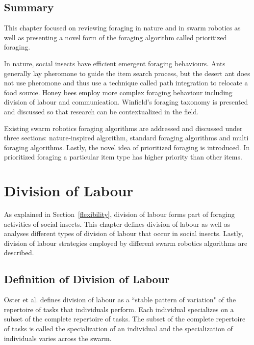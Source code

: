 \section{Summary}
\label{foraging:summary}

This chapter focused on reviewing foraging in nature and in swarm robotics as well as presenting a novel form of the foraging algorithm called prioritized foraging. 

In nature, social insects have efficient emergent foraging behaviours. Ants generally lay pheromone to guide the item search process, but the desert ant does not use pheromone and thus use a technique called path integration to relocate a food source. Honey bees employ more complex foraging behaviour including division of labour and communication. Winfield's foraging taxonomy is presented and discussed so that research can be contextualized in the field. 

Existing swarm robotics foraging algorithms are addressed and discussed under three sections: nature-inspired algorithm, standard foraging algorithms and multi foraging algorithms. Lastly, the novel idea of prioritized foraging is introduced. In prioritized foraging a particular item type has higher priority than other items. 

\chapter{Division of Labour}
\label{chap:divisionoflabour}


As explained in Section~\ref{flexibility}, division of labour forms part of foraging activities of social insects. This chapter defines division of labour as well as analyses different types of division of labour that occur in social insects. Lastly, division of labour strategies employed by different swarm robotics algorithms are described. 

\section{Definition of Division of Labour}
\label{division:definition}

Oster et al. \cite{oster1978caste} defines division of labour as a ``stable pattern of variation" of the repertoire of tasks that individuals perform. Each individual specializes on a subset of the complete repertoire of tasks. The subset of the complete repertoire of tasks is called the specialization of an individual and the specialization of individuals varies across the swarm. 

